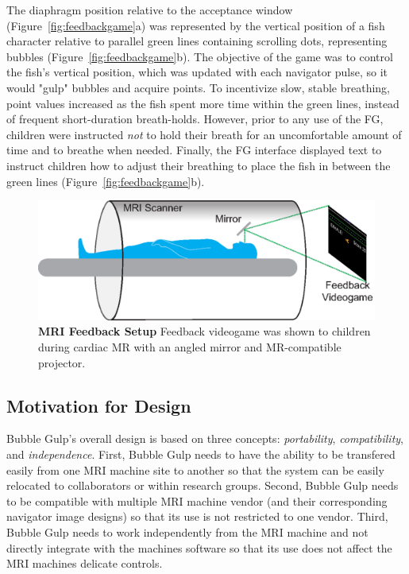 	The diaphragm position relative to the acceptance window (Figure~\ref{fig:feedbackgame}a) was represented by the vertical position of a fish character relative to parallel green lines containing scrolling dots, representing bubbles (Figure~\ref{fig:feedbackgame}b). The objective of the game was to control the fish's vertical position, which was updated with each navigator pulse, so it would "gulp" bubbles and acquire points. To incentivize slow, stable breathing, point values increased as the fish spent more time within the green lines, instead of frequent short-duration breath-holds. However, prior to any use of the FG, children were instructed \textit{not} to hold their breath for an uncomfortable amount of time and to breathe when needed. Finally, the FG interface displayed text to instruct children how to adjust their breathing to place the fish in between the green lines (Figure~\ref{fig:feedbackgame}b).
	
	\begin{figure} 
		\includegraphics{figures/gamepaper/02-feedback_videogame_in_mri}
		\caption[MRI Feedback Setup]{\textbf{MRI Feedback Setup} Feedback videogame was shown to children during cardiac MR with an angled mirror and MR-compatible projector.}
		\label{fig:MRI_feedback}
	\end{figure}

\subsection{Motivation for Design}
	Bubble Gulp's overall design is based on three concepts: \textit{portability}, \textit{compatibility}, and \textit{independence}. First, Bubble Gulp needs to have the ability to be transfered easily from one MRI machine site to another so that the system can be easily relocated to collaborators or within research groups. Second, Bubble Gulp needs to be compatible with multiple MRI machine vendor (and their corresponding navigator image designs) so that its use is not restricted to one vendor. Third, Bubble Gulp needs to work independently from the MRI machine and not directly integrate with the machines software so that its use does not affect the MRI machines delicate controls.
	
